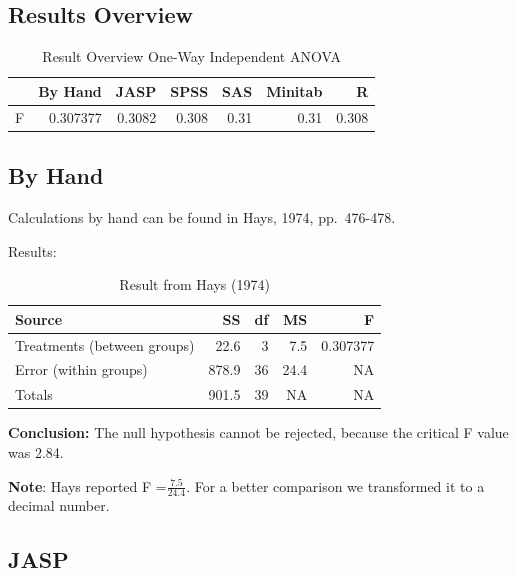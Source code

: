 \documentclass[
]{book}
\begin{document}
\hypertarget{results-overview}{%
\subsection{Results Overview}\label{results-overview}}

\begin{table}

\caption{\label{tab:unnamed-chunk-38}Result Overview One-Way Independent ANOVA}
\centering
\begin{tabular}[t]{lrrrrrr}
\toprule
  & By Hand & JASP & SPSS & SAS & Minitab & R\\
\midrule
F & 0.307377 & 0.3082 & 0.308 & 0.31 & 0.31 & 0.308\\
\bottomrule
\end{tabular}
\end{table}

\hypertarget{by-hand}{%
\subsection{By Hand}\label{by-hand}}

Calculations by hand can be found in Hays, 1974, pp.~476-478.

Results:

\begin{table}

\caption{\label{tab:unnamed-chunk-39}Result from Hays (1974)}
\centering
\begin{tabular}[t]{lrrrr}
\toprule
Source & SS & df & MS & F\\
\midrule
Treatments (between groups) & 22.6 & 3 & 7.5 & 0.307377\\
Error (within groups) & 878.9 & 36 & 24.4 & NA\\
Totals & 901.5 & 39 & NA & NA\\
\bottomrule
\end{tabular}
\end{table}

\textbf{Conclusion:} The null hypothesis cannot be rejected, because the critical F value was 2.84.

\textbf{Note}: Hays reported F =\(\frac{7.5}{24.4}\). For a better comparison we transformed it to a decimal number.

\hypertarget{jasp}{%
\subsection{JASP}\label{jasp}}
\end{document}
